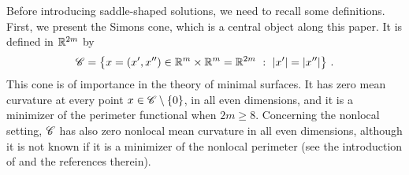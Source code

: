 Before introducing saddle-shaped solutions, we need to recall some definitions. First, we present the Simons cone, which is a central object along this paper. It is defined in $\mathbb{R}^{2m}$ by
\begin{equation}
\label{Eq:SimonsCone}
\mathscr{C} = \left \{ x = (x', x'') \in \mathbb{R}^m \times \mathbb{R}^m = \mathbb{R}^{2m} \ : \ |x'| = |x''| \right \}\,.
\end{equation}
This cone is of importance in the theory of minimal surfaces. It has zero mean curvature at every point $x\in \mathscr{C} \setminus \{0\}$, in all even dimensions, and it is a minimizer of the perimeter functional when $2m\geq 8$. Concerning the nonlocal setting, $\mathscr{C}$ has also zero nonlocal mean curvature in all even dimensions, although it is not known if it is a minimizer of the nonlocal perimeter (see the introduction of \cite{Felipe-Sanz-Perela:SaddleFractional} and the references therein).





